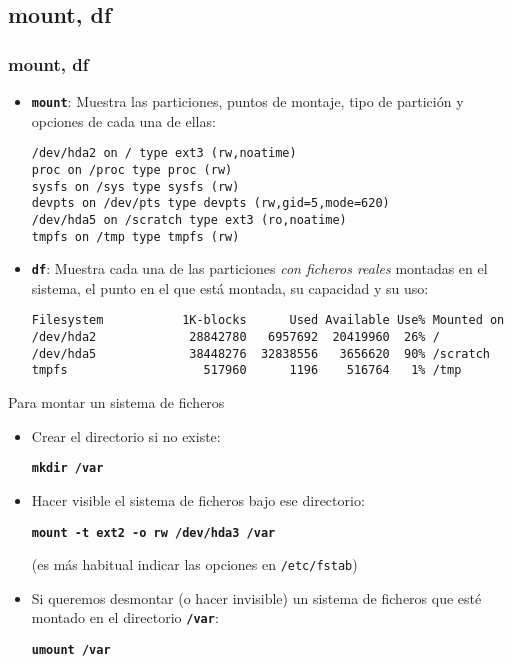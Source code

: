 \documentclass[ucs]{beamer}
\begin{document}
  \subsection{mount, df}
\begin{frame}[fragile]
  \frametitle{mount, df}
  \begin{itemize}
  \item \texttt{\textbf{mount}}: Muestra las particiones, puntos de
    montaje, tipo de partición y opciones de cada una de ellas:
    {\flushleft\fontsize{7pt}{7pt}\selectfont
\begin{verbatim}
/dev/hda2 on / type ext3 (rw,noatime)
proc on /proc type proc (rw)
sysfs on /sys type sysfs (rw)
devpts on /dev/pts type devpts (rw,gid=5,mode=620)
/dev/hda5 on /scratch type ext3 (ro,noatime)
tmpfs on /tmp type tmpfs (rw)
\end{verbatim}
    }
  \item \texttt{\textbf{df}}: Muestra cada una de las particiones
    \emph{con ficheros reales} montadas en el sistema, el punto en el que
    está montada, su capacidad y su uso:
    {\flushleft\fontsize{7pt}{7pt}\selectfont
\begin{verbatim}
Filesystem           1K-blocks      Used Available Use% Mounted on
/dev/hda2             28842780   6957692  20419960  26% /
/dev/hda5             38448276  32838556   3656620  90% /scratch
tmpfs                   517960      1196    516764   1% /tmp
\end{verbatim}
    }
  \end{itemize}
\end{frame}


\begin{frame}[fragile]
  Para montar un sistema de ficheros 
  \begin{itemize}
  \item Crear el directorio si no existe:

    \texttt{\textbf{mkdir /var}}
  \item Hacer visible el sistema de ficheros bajo ese directorio:

    \texttt{\textbf{mount -t ext2 -o rw /dev/hda3 /var}}

(es más habitual indicar las opciones en \verb|/etc/fstab|)

  \item Si queremos desmontar (o hacer invisible) un sistema de
    ficheros que esté montado en el directorio \texttt{\textbf{/var}}:

    \texttt{\textbf{umount /var}}
  \end{itemize}
\end{frame}
\end{document}
